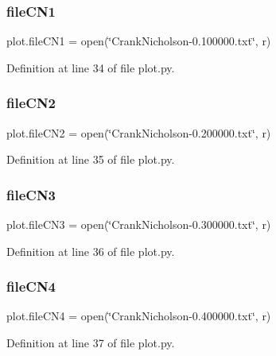 \mbox{\label{namespaceplot_a721fb37adcbd41708ef47ab4896292d6}} 
\subsubsection{file\+C\+N1}
{\footnotesize\ttfamily plot.\+file\+C\+N1 = open(\char`\"{}Crank\+Nicholson-\/0.\+100000.txt\char`\"{}, \textquotesingle{}r\textquotesingle{})}



Definition at line 34 of file plot.\+py.

\mbox{\label{namespaceplot_a6748e0e42dda76dcaaa2bf3b5cbebfde}} 
\subsubsection{file\+C\+N2}
{\footnotesize\ttfamily plot.\+file\+C\+N2 = open(\char`\"{}Crank\+Nicholson-\/0.\+200000.txt\char`\"{}, \textquotesingle{}r\textquotesingle{})}



Definition at line 35 of file plot.\+py.

\mbox{\label{namespaceplot_a63a7e4dda7feda80ba6b1813a8a7937d}} 
\subsubsection{file\+C\+N3}
{\footnotesize\ttfamily plot.\+file\+C\+N3 = open(\char`\"{}Crank\+Nicholson-\/0.\+300000.txt\char`\"{}, \textquotesingle{}r\textquotesingle{})}



Definition at line 36 of file plot.\+py.

\mbox{\label{namespaceplot_a838e30c2f4009be97f70eae2ad5fc7f5}} 
\subsubsection{file\+C\+N4}
{\footnotesize\ttfamily plot.\+file\+C\+N4 = open(\char`\"{}Crank\+Nicholson-\/0.\+400000.txt\char`\"{}, \textquotesingle{}r\textquotesingle{})}



Definition at line 37 of file plot.\+py.


